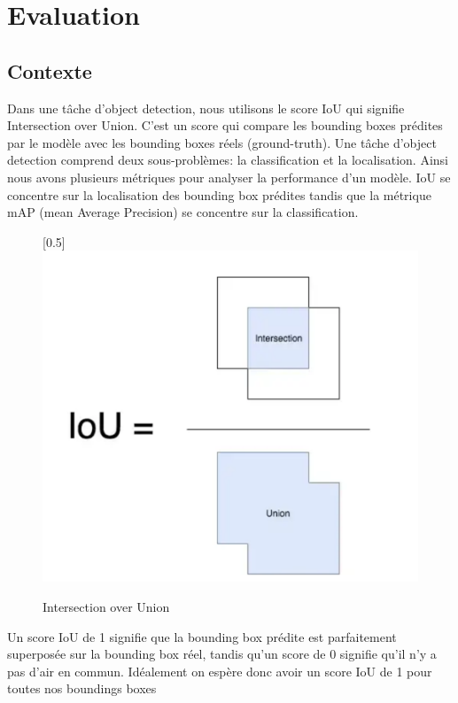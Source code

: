\chapter{Evaluation}
\label{chap:Evaluation}

\section{Contexte}
Dans une tâche d'object detection, nous utilisons le score IoU qui signifie Intersection over Union.
C'est un score qui compare les bounding boxes prédites par le modèle avec les bounding boxes réels (ground-truth).
Une tâche d'object detection comprend deux sous-problèmes: la classification et la localisation.
Ainsi nous avons plusieurs métriques pour analyser la performance d'un modèle. IoU se concentre sur 
la localisation des bounding box prédites tandis que la métrique mAP (mean Average Precision) 
se concentre sur la classification.
\begin{figure}[bh!]
    \centering
    \scalebox{0.5}[0.5]{\includegraphics[width=\textwidth]{images/iou.png}}
    \caption{Intersection over Union}
    \label{fig:iou}
\end{figure}
Un score IoU de 1 signifie que la bounding box prédite est parfaitement superposée sur la bounding box réel, tandis qu'un score de 0 signifie qu'il n'y a pas d'air en commun. Idéalement on espère donc avoir un score IoU de 1 pour toutes nos boundings boxes


